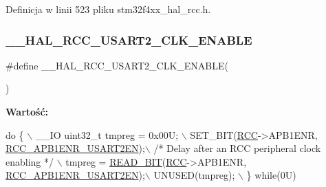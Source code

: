Definicja w linii 523 pliku stm32f4xx\+\_\+hal\+\_\+rcc.\+h.

\mbox{\label{group___r_c_c___a_p_b1___clock___enable___disable_gaaf50c7d2265d978fab8fbb68a518096d}} 
\subsubsection{\texorpdfstring{\+\_\+\+\_\+\+H\+A\+L\+\_\+\+R\+C\+C\+\_\+\+U\+S\+A\+R\+T2\+\_\+\+C\+L\+K\+\_\+\+E\+N\+A\+B\+LE}{\_\_HAL\_RCC\_USART2\_CLK\_ENABLE}}
{\footnotesize\ttfamily \#define \+\_\+\+\_\+\+H\+A\+L\+\_\+\+R\+C\+C\+\_\+\+U\+S\+A\+R\+T2\+\_\+\+C\+L\+K\+\_\+\+E\+N\+A\+B\+LE(\begin{DoxyParamCaption}{ }\end{DoxyParamCaption})}

{\bfseries Wartość\+:}
\begin{DoxyCode}
\textcolor{keywordflow}{do} \{ \(\backslash\)
                                        \_\_IO uint32\_t tmpreg = 0x00U; \(\backslash\)
                                        SET\_BIT(\hyperlink{group___peripheral__declaration_ga74944438a086975793d26ae48d5882d4}{RCC}->APB1ENR, 
      \hyperlink{group___peripheral___registers___bits___definition_gab840af4f735ec36419d61c7db3cfa00d}{RCC\_APB1ENR\_USART2EN});\(\backslash\)
                                        \textcolor{comment}{/* Delay after an RCC peripheral clock enabling */} \(\backslash\)
                                        tmpreg = \hyperlink{group___exported__macro_ga822bb1bb9710d5f2fa6396b84e583c33}{READ\_BIT}(\hyperlink{group___peripheral__declaration_ga74944438a086975793d26ae48d5882d4}{RCC}->APB1ENR, 
      \hyperlink{group___peripheral___registers___bits___definition_gab840af4f735ec36419d61c7db3cfa00d}{RCC\_APB1ENR\_USART2EN});\(\backslash\)
                                        UNUSED(tmpreg); \(\backslash\)
                                          \} \textcolor{keywordflow}{while}(0U)
\end{DoxyCode}


